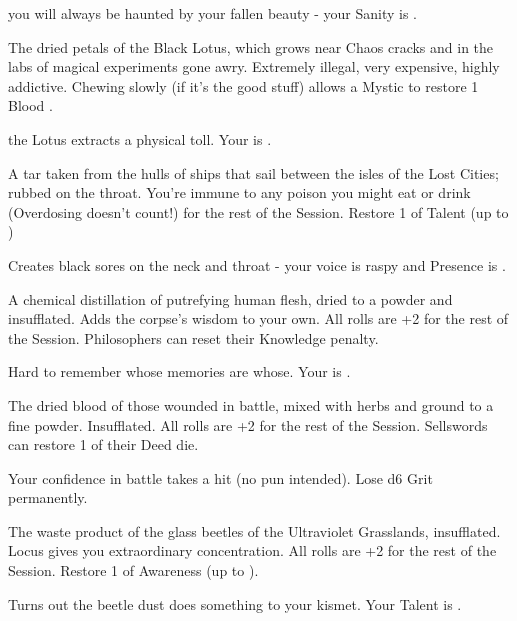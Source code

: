 {\begin{multicols}{2}
    you will always be haunted by your fallen beauty - your \MAX Sanity is \DCDOWN.


  The dried petals of the Black Lotus, which grows near Chaos cracks and in the labs of magical experiments gone awry. Extremely illegal, very expensive, highly addictive.  Chewing slowly (if it's the good stuff) allows a Mystic to restore 1 Blood \POOL.

    the Lotus extracts a physical toll.  Your \MAX \VIG is \DCDOWN.



  A tar taken from the hulls of ships that sail between the isles of the Lost Cities; rubbed on the throat. You're immune to any poison you might eat or drink (Overdosing doesn't count!) for the rest of the Session. Restore 1 \UD of Talent (up to \MAX)

     Creates black sores on the neck and throat - your voice is raspy and \MAX Presence is \DCDOWN.



  A chemical distillation of putrefying human flesh, dried to a powder and insufflated. Adds the corpse's wisdom to your own.  All \INT rolls are +2 for the rest of the Session. Philosophers can reset their Knowledge penalty.

     Hard to remember whose memories are whose.  Your \MAX \FOC is \DCDOWN.


    The dried blood of those wounded in battle, mixed with herbs and ground to a fine powder.  Insufflated.  All \VIG rolls are +2 for the rest of the Session. Sellswords can restore 1 \UD of their Deed die.

     Your confidence in battle takes a hit (no pun intended).  Lose d6 Grit permanently.



  The waste product of the glass beetles of the Ultraviolet Grasslands, insufflated.  Locus gives you extraordinary concentration.  All \FOC rolls are +2 for the rest of the Session.  Restore 1 \UD of Awareness (up to \MAX).

    Turns out the beetle dust does something to your kismet.   Your \MAX Talent is \DCDOWN.



\end{multicols}}
